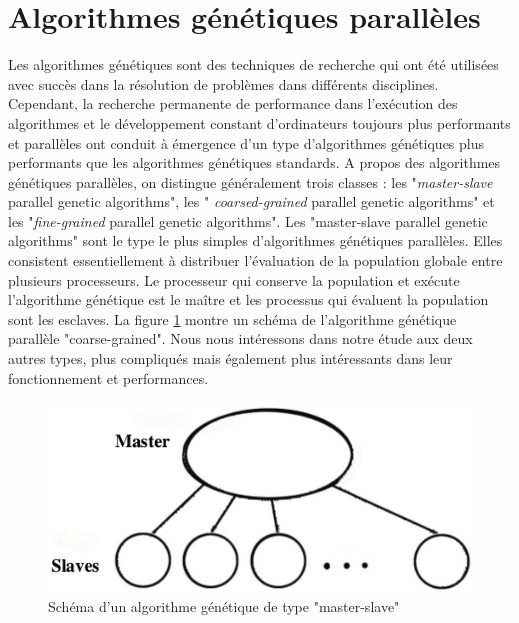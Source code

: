 \documentclass[12pt,a4paper]{article}
\begin{document}
	\section{Algorithmes génétiques parallèles}	
	Les algorithmes génétiques sont des techniques de recherche qui ont été utilisées avec succès dans la résolution de problèmes dans différents disciplines. Cependant, la recherche permanente de performance dans l'exécution des algorithmes et le développement constant d'ordinateurs toujours plus performants et parallèles ont conduit à émergence d'un type d'algorithmes génétiques plus performants que les algorithmes génétiques standards. A propos des algorithmes génétiques parallèles, on distingue généralement trois classes : les "\emph{master-slave} parallel genetic algorithms", les "\emph{ coarsed-grained} parallel genetic algorithms" et les "\emph{fine-grained} parallel genetic algorithms". Les "master-slave parallel genetic algorithms" sont le type le plus simples d'algorithmes génétiques parallèles. Elles consistent essentiellement à distribuer l'évaluation de la population globale entre plusieurs processeurs. Le processeur qui conserve la population et exécute l'algorithme génétique est le maître et les processus qui évaluent la population sont les esclaves. La figure \ref{fig:master_slave_ga} montre un schéma de l'algorithme génétique parallèle "coarse-grained". Nous nous intéressons dans notre étude aux deux autres types, plus compliqués mais également plus intéressants dans leur fonctionnement et performances.
	
	\begin{figure}[!h]
		\begin{center}
			\includegraphics[scale=.3]{img/master_slave_ga.png}
			\caption{Schéma d'un algorithme génétique de type "master-slave"}
			\label{fig:master_slave_ga}
		\end{center}
	\end{figure}
	
	\newpage	
	
\end{document}
